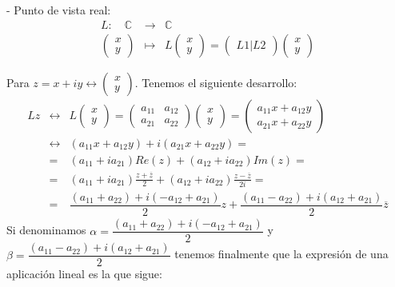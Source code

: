 - Punto de vista real:
\begin{eqnarray*}
  L : \quad \mathbb{C}^{ } & \rightarrow & \mathbb{C}^{} \\
 \begin{pmatrix}
   x \\
   y
 \end{pmatrix} & \mapsto & L\begin{pmatrix}
   x \\
   y
 \end{pmatrix} = \begin{pmatrix}
   L1 | L2
 \end{pmatrix}\begin{pmatrix}
   x \\
   y
 \end{pmatrix}
\end{eqnarray*}

Para \(z = x+iy \leftrightarrow \begin{pmatrix}
 x \\
 y
\end{pmatrix} \). Tenemos el siguiente desarrollo:
\begin{eqnarray*}
  Lz & \leftrightarrow & L\begin{pmatrix}
    x \\
    y
  \end{pmatrix} = \begin{pmatrix}
  a_{11} & a_{12} \\
  a_{21} & a_{22}
  \end{pmatrix}\begin{pmatrix}
    x \\
    y
  \end{pmatrix} = \begin{pmatrix}
  a_{11}x + a_{12}y \\
  a_{21}x + a_{22}y
  \end{pmatrix} \\
   & \leftrightarrow & (a_{11}x + a_{12}y)+i(a_{21}x + a_{22}y) = \\
   & = & (a_{11}+ia_{21})Re(z) + (a_{12}+ia_{22})Im(z) = \\
   & = & (a_{11}+ia_{21})\frac{z+\overline{z}}{2} + (a_{12}+ia_{22})\frac{z-\overline{z}}{2i} = \\
   & = & \dfrac{(a_{11}+a_{22})+i(-a_{12}+a_{21})}{2}z+\dfrac{(a_{11}-a_{22})+i(a_{12}+a_{21})}{2}\overline{z}
\end{eqnarray*}
Si denominamos \( \alpha = \dfrac{(a_{11}+a_{22})+i(-a_{12}+a_{21})}{2} \) y \( \beta = \dfrac{(a_{11}-a_{22})+i(a_{12}+a_{21})}{2} \) tenemos finalmente que la expresión de una aplicación lineal es la que sigue:

